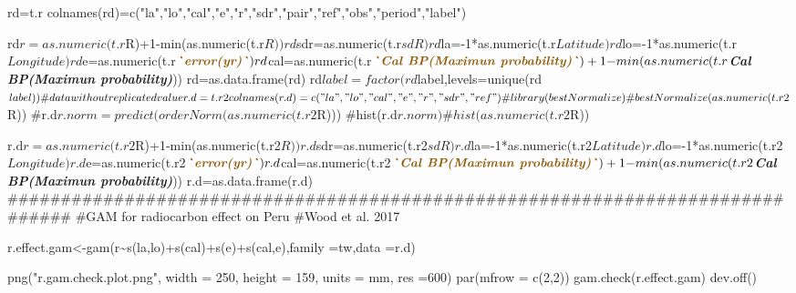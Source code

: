 \documentclass[
]{article}
\newenvironment{Shaded}{\begin{snugshade}}{\end{snugshade}}
\newcommand{\InformationTok}[1]{\textcolor[rgb]{0.56,0.35,0.01}{\textbf{\textit{#1}}}}
\newcommand{\NormalTok}[1]{#1}
\begin{document}
\begin{Shaded}
\begin{Highlighting}[]
\NormalTok{rd=t.r}
\NormalTok{colnames(rd)=c("la","lo","cal","e","r","sdr","pair","ref","obs","period","label")}

\NormalTok{rd$r=as.numeric(t.r$R)+1{-}min(as.numeric(t.r$R))}
\NormalTok{rd$sdr=as.numeric(t.r$sdR)}
\NormalTok{rd$la={-}1*as.numeric(t.r$Latitude)}
\NormalTok{rd$lo={-}1*as.numeric(t.r$Longitude)}
\NormalTok{rd$e=as.numeric(t.r$}\InformationTok{\textasciigrave{}error(yr)\textasciigrave{}}\NormalTok{)}
\NormalTok{rd$cal=as.numeric(t.r$}\InformationTok{\textasciigrave{}Cal BP(Maximun probability)\textasciigrave{}}\NormalTok{)+1{-}min(as.numeric(t.r$}\InformationTok{\textasciigrave{}Cal BP(Maximun probability)\textasciigrave{}}\NormalTok{))}
\NormalTok{rd=as.data.frame(rd)}
\NormalTok{rd$label=factor(rd$label,levels=unique(rd$label))}

\NormalTok{\#data without replicated value}

\NormalTok{r.d=t.r2}
\NormalTok{colnames(r.d)=c("la","lo","cal","e","r","sdr","ref")}

\NormalTok{\#library(bestNormalize)}
\NormalTok{\#bestNormalize(as.numeric(t.r2$R))}
\NormalTok{\#r.d$r.norm=predict(orderNorm(as.numeric(t.r2$R)))}
\NormalTok{\#hist(r.d$r.norm)}
\NormalTok{\#hist(as.numeric(t.r2$R))}

\NormalTok{r.d$r=as.numeric(t.r2$R)+1{-}min(as.numeric(t.r2$R))}
\NormalTok{r.d$sdr=as.numeric(t.r2$sdR)}
\NormalTok{r.d$la={-}1*as.numeric(t.r2$Latitude)}
\NormalTok{r.d$lo={-}1*as.numeric(t.r2$Longitude)}
\NormalTok{r.d$e=as.numeric(t.r2$}\InformationTok{\textasciigrave{}error(yr)\textasciigrave{}}\NormalTok{)}
\NormalTok{r.d$cal=as.numeric(t.r2$}\InformationTok{\textasciigrave{}Cal BP(Maximun probability)\textasciigrave{}}\NormalTok{)+1{-}min(as.numeric(t.r2$}\InformationTok{\textasciigrave{}Cal BP(Maximun probability)\textasciigrave{}}\NormalTok{))}
\NormalTok{r.d=as.data.frame(r.d)}
\NormalTok{\#\#\#\#\#\#\#\#\#\#\#\#\#\#\#\#\#\#\#\#\#\#\#\#\#\#\#\#\#\#\#\#\#\#\#\#\#\#\#\#\#\#\#\#\#\#\#\#\#\#\#\#\#\#\#\#\#\#\#\#\#\#\#\#\#\#\#\#\#\#\#\#\#\#\#\#\#\#\#}
\NormalTok{\#GAM for radiocarbon effect on Peru }
\NormalTok{\#Wood et al. 2017}

\NormalTok{r.effect.gam\textless{}{-}gam(r\textasciitilde{}s(la,lo)+s(cal)+s(e)+s(cal,e),family =tw,data =r.d)}

\NormalTok{png("r.gam.check.plot.png", width = 250, height = 159, units = \textquotesingle{}mm\textquotesingle{}, res =600)}
\NormalTok{par(mfrow = c(2,2))}
\NormalTok{gam.check(r.effect.gam)}
\NormalTok{dev.off()}


\end{Highlighting}
\end{Shaded}
\end{document}
